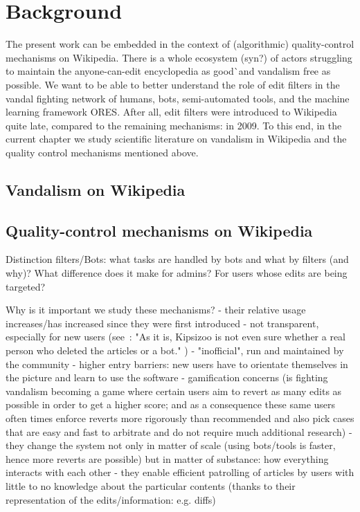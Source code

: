 \chapter{Background}
\label{chap:background}

The present work can be embedded in the context of (algorithmic) quality-control mechanisms on Wikipedia.
There is a whole ecosystem (syn?) of actors struggling to maintain the anyone-can-edit encyclopedia as good^^ and vandalism free as possible.
We want to be able to better understand the role of edit filters in the vandal fighting network of humans, bots, semi-automated tools, and the machine learning framework ORES.
After all, edit filters were introduced to Wikipedia quite late, compared to the remaining mechanisms: in 2009. %
To this end, in the current chapter we study scientific literature on vandalism in Wikipedia and the quality control mechanisms mentioned above.

\section{Vandalism on Wikipedia}

\section{Quality-control mechanisms on Wikipedia}

Distinction filters/Bots: what tasks are handled by bots and what by filters (and why)? What difference does it make for admins? For users whose edits are being targeted?

Why is it important we study these mechanisms?
- their relative usage increases/has increased since they were first introduced
- not transparent, especially for new users (see~\cite{ForGei2012}: "As it is, Kipsizoo is not even
sure whether a real person who deleted the articles or a bot." )
- "inofficial", run and maintained by the community
- higher entry barriers: new users have to orientate themselves in the picture and learn to use the software
- gamification concerns (is fighting vandalism becoming a game where certain users aim to revert as many edits as possible in order to get a higher score; and as a consequence these same users often times enforce reverts more rigorously than recommended and also pick cases that are easy and fast to arbitrate and do not require much additional research)
- they change the system not only in matter of scale (using bots/tools is faster, hence more reverts are possible) but in matter of substance: how everything interacts with each other
- they enable efficient patrolling of articles by users with little to no knowledge about the particular contents (thanks to their representation of the edits/information: e.g. diffs)

